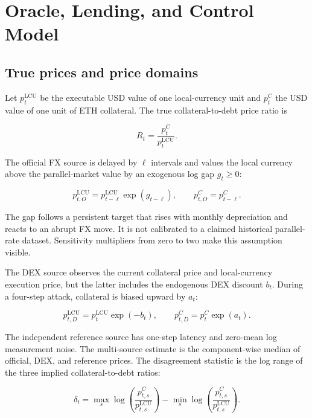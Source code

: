 \documentclass[sn-vancouver,Numbered]{sn-jnl}
\newcommand{\lcu}{\mathrm{LCU}}
\begin{document}
\section{Oracle, Lending, and Control Model}\label{sec:model}

\subsection{True prices and price domains}

Let $p_t^{\lcu}$ be the executable USD value of one local-currency unit and $p_t^C$ the USD value of one unit of ETH collateral. The true collateral-to-debt price ratio is

\begin{equation}
 R_t=\frac{p_t^C}{p_t^{\lcu}}.
 \label{eq:true-ratio}
\end{equation}

The official FX source is delayed by $\ell$ intervals and values the local currency above the parallel-market value by an exogenous log gap $g_t\geq0$:

\begin{equation}
 p_{t,O}^{\lcu}=p_{t-\ell}^{\lcu}\exp(g_{t-\ell}),
 \qquad p_{t,O}^{C}=p_{t-\ell}^{C}.
 \label{eq:official}
\end{equation}

The gap follows a persistent target that rises with monthly depreciation and reacts to an abrupt FX move. It is not calibrated to a claimed historical parallel-rate dataset. Sensitivity multipliers from zero to two make this assumption visible.

The DEX source observes the current collateral price and local-currency execution price, but the latter includes the endogenous DEX discount $b_t$. During a four-step attack, collateral is biased upward by $a_t$:

\begin{equation}
 p_{t,D}^{\lcu}=p_t^{\lcu}\exp(-b_t),
 \qquad p_{t,D}^{C}=p_t^C\exp(a_t).
 \label{eq:dex-source}
\end{equation}

The independent reference source has one-step latency and zero-mean log measurement noise. The multi-source estimate is the component-wise median of official, DEX, and reference prices. The disagreement statistic is the log range of the three implied collateral-to-debt ratios:

\begin{equation}
 \delta_t=\max_s\log\!\left(\frac{p_{t,s}^C}{p_{t,s}^{\lcu}}\right)
 -\min_s\log\!\left(\frac{p_{t,s}^C}{p_{t,s}^{\lcu}}\right).
 \label{eq:disagreement}
\end{equation}
\end{document}
